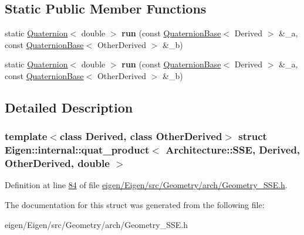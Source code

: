 \subsection*{Static Public Member Functions}
\begin{DoxyCompactItemize}
\item 
\mbox{\label{struct_eigen_1_1internal_1_1quat__product_3_01_architecture_1_1_s_s_e_00_01_derived_00_01_other_derived_00_01double_01_4_ad06b0370781a1ef18da8897a5f8c912f}} 
static \hyperlink{group___geometry___module_class_eigen_1_1_quaternion}{Quaternion}$<$ double $>$ {\bfseries run} (const \hyperlink{group___geometry___module_class_eigen_1_1_quaternion_base}{Quaternion\+Base}$<$ Derived $>$ \&\+\_\+a, const \hyperlink{group___geometry___module_class_eigen_1_1_quaternion_base}{Quaternion\+Base}$<$ Other\+Derived $>$ \&\+\_\+b)
\item 
\mbox{\label{struct_eigen_1_1internal_1_1quat__product_3_01_architecture_1_1_s_s_e_00_01_derived_00_01_other_derived_00_01double_01_4_ad06b0370781a1ef18da8897a5f8c912f}} 
static \hyperlink{group___geometry___module_class_eigen_1_1_quaternion}{Quaternion}$<$ double $>$ {\bfseries run} (const \hyperlink{group___geometry___module_class_eigen_1_1_quaternion_base}{Quaternion\+Base}$<$ Derived $>$ \&\+\_\+a, const \hyperlink{group___geometry___module_class_eigen_1_1_quaternion_base}{Quaternion\+Base}$<$ Other\+Derived $>$ \&\+\_\+b)
\end{DoxyCompactItemize}


\subsection{Detailed Description}
\subsubsection*{template$<$class Derived, class Other\+Derived$>$\newline
struct Eigen\+::internal\+::quat\+\_\+product$<$ Architecture\+::\+S\+S\+E, Derived, Other\+Derived, double $>$}



Definition at line \hyperlink{eigen_2_eigen_2src_2_geometry_2arch_2_geometry___s_s_e_8h_source_l00084}{84} of file \hyperlink{eigen_2_eigen_2src_2_geometry_2arch_2_geometry___s_s_e_8h_source}{eigen/\+Eigen/src/\+Geometry/arch/\+Geometry\+\_\+\+S\+S\+E.\+h}.



The documentation for this struct was generated from the following file\+:\begin{DoxyCompactItemize}
\item 
eigen/\+Eigen/src/\+Geometry/arch/\+Geometry\+\_\+\+S\+S\+E.\+h\end{DoxyCompactItemize}
